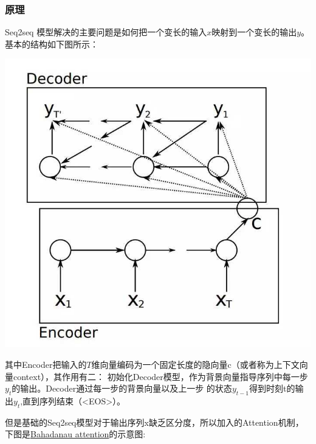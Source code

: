 \documentclass[UTF8,a4paper,10pt]{ctexart}
\begin{document}
   \subsubsection{原理}

    Seq2seq 模型解决的主要问题是如何把一个变长的输入$x$映射到一个变长的输出$y​$。基本的结构如下图所示：
    
    \centerline{\includegraphics[scale=0.3]{pics/190417-s1.jpg}}
    

    其中Encoder把输入的$T$维向量编码为一个固定长度的隐向量c（或者称为上下文向量context），其作用有二：
    初始化Decoder模型，作为背景向量指导序列中每一步$y_t$的输出。Decoder通过每一步的背景向量以及上一步
    的状态$y_{t-1}$得到时刻t的输出$y_t$,直到序列结束（<EOS>）。

    但是基础的Seq2seq模型对于输出序列x缺乏区分度，所以加入的Attention机制，下图是\href{https://arxiv.org/abs/1409.0473}{\color{blue}Bahadanau attention}的示意图:
    
\end{document}
